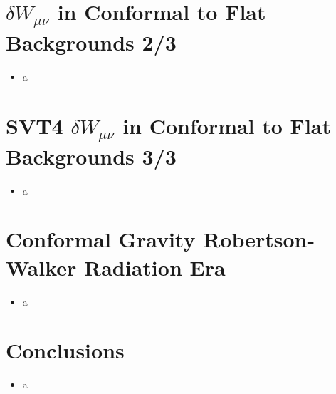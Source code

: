 \documentclass[10pt,letterpaper]{article}
\numberwithin{equation}{section}
\begin{document}

\section{$\delta W_{\mu\nu}$ in Conformal to Flat Backgrounds 2/3}
\begin{itemize}
	\item a
\end{itemize}


\section{SVT4 $\delta W_{\mu\nu}$ in Conformal to Flat Backgrounds 3/3}
\begin{itemize}
	\item a
\end{itemize}


\section{Conformal Gravity Robertson-Walker Radiation Era}
\begin{itemize}
	\item a
\end{itemize}


\section{Conclusions}
\begin{itemize}
	\item a
\end{itemize}

\end{document}
